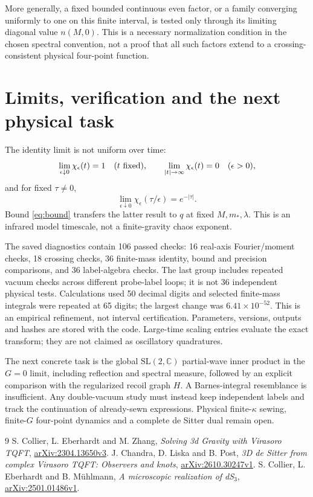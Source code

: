 \documentclass[11pt,a4paper]{article}
\begin{document}
More generally, a fixed bounded continuous even factor, or a family
converging uniformly to one on this finite interval, is tested only
through its limiting diagonal value \(n(M,0)\). This is a necessary
normalization condition in the chosen spectral convention, not
a proof that all such factors extend to a crossing-consistent
physical four-point function.

\section{Limits, verification and the next physical task}
The identity limit is not uniform over time:
\begin{equation}
 \lim_{\epsilon\downarrow0}\chi_\epsilon(t)=1
 \quad(t\ {\rm fixed}),\qquad
 \lim_{|t|\to\infty}\chi_\epsilon(t)=0
 \quad(\epsilon>0),
\end{equation}
and for fixed \(\tau\ne0\),
\begin{equation}
 \lim_{\epsilon\downarrow0}\chi_\epsilon(\tau/\epsilon)
 =e^{-|\tau|}.
\end{equation}
Bound \eqref{eq:bound} transfers the latter result to \(q\) at fixed
\(M,m_*,\lambda\). This is an infrared model timescale, not a
finite-gravity chaos exponent.

The saved diagnostics contain 106 passed checks: 16 real-axis
Fourier/moment checks, 18 crossing checks, 36 finite-mass identity,
bound and precision comparisons, and 36 label-algebra checks.
The last group includes repeated vacuum checks across different
probe-label loops; it is not 36 independent physical tests.
Calculations used 50 decimal digits and selected finite-mass
integrals were repeated at 65 digits; the largest change was
\(6.41\times10^{-52}\). This is an empirical refinement, not
interval certification. Parameters, versions, outputs and hashes
are stored with the code. Large-time scaling entries evaluate
the exact transform; they are not claimed as oscillatory quadratures.

The next concrete task is the global \(\mathrm{SL}(2,\mathbb C)\)
partial-wave inner product in the \(G=0\) limit, including reflection
and spectral measure, followed by an explicit comparison with the
regularized recoil graph \(H\). A Barnes-integral resemblance is
insufficient. Any double-vacuum study must instead keep independent
labels and track the continuation of already-sewn expressions.
Physical finite-\(\kappa\) sewing, finite-\(G\) four-point dynamics
and a complete de Sitter dual remain open.

\begin{thebibliography}{9}
 S. Collier, L. Eberhardt and M. Zhang,
\emph{Solving 3d Gravity with Virasoro TQFT},
\href{https://arxiv.org/html/2304.13650v3}{arXiv:2304.13650v3}.
 J. Chandra, D. Liska and B. Post,
\emph{3D de Sitter from complex Virasoro TQFT: Observers and knots},
\href{https://arxiv.org/html/2610.30247v1}{arXiv:2610.30247v1}.
 S. Collier, L. Eberhardt and B. M\"uhlmann,
\emph{A microscopic realization of dS$_3$},
\href{https://arxiv.org/html/2501.01486v1}{arXiv:2501.01486v1}.
\end{thebibliography}
\end{document}
